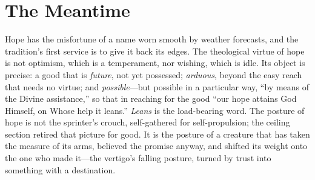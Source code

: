 \section{The Meantime}

Hope has the misfortune of a name worn smooth by weather forecasts, and the tradition's first service is to give it back its edges. The theological virtue of hope is not optimism, which is a temperament, nor wishing, which is idle. Its object is precise: a good that is \emph{future}, not yet possessed; \emph{arduous}, beyond the easy reach that needs no virtue; and \emph{possible}---but possible in a particular way, ``by means of the Divine assistance,'' so that in reaching for the good ``our hope attains God Himself, on Whose help it leans.'' \emph{Leans} is the load-bearing word. The posture of hope is not the sprinter's crouch, self-gathered for self-propulsion; the ceiling section retired that picture for good. It is the posture of a creature that has taken the measure of its arms, believed the promise anyway, and shifted its weight onto the one who made it---the vertigo's falling posture, turned by trust into something with a destination.

